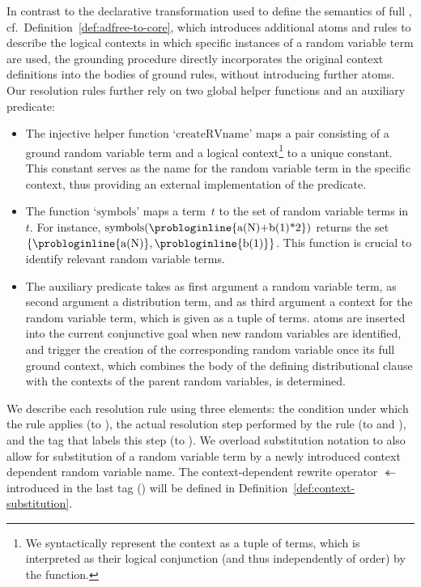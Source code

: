In contrast to the declarative transformation used to define the semantics of full \dcproblogsty, cf.~Definition~\ref{def:adfree-to-core}, which introduces additional atoms and rules to describe the logical contexts in which specific instances of a random variable term are used, the grounding procedure directly incorporates the original context definitions into the bodies of ground rules, without introducing further atoms.  
Our resolution rules further rely on two global helper functions and an auxiliary predicate:
\begin{itemize}
	\item The injective helper function `$\mathrm{createRVname}$' maps a pair consisting of a ground random variable term and a logical context\footnote{We syntactically represent the context as a tuple of terms, which is interpreted as their logical conjunction (and thus independently of order) by the function.} to a unique constant. This constant serves as the name for the random variable term in the specific context, thus providing an external implementation of the  predicate.
	\item The function `$\mathrm{symbols}$' maps a term~$t$  to the set of random variable terms in~$t$.  For instance, $\mathrm{symbols}(\text{\probloginline{a(N)+b(1)*2}})$ returns the set $\{ \text{\probloginline{a(N)}}, \text{\probloginline{b(1)}} \}$. This function is crucial to identify relevant random variable terms. 
	\item The auxiliary predicate   takes as first argument a random variable term, as second argument a distribution term, and as third argument a context for the random variable term, which is given as a tuple of terms.  atoms are inserted into the current conjunctive goal when new random variables are identified, and trigger the creation of the corresponding random variable once its full ground context, which combines the body of the defining distributional clause with the contexts of the parent random variables, is determined.
\end{itemize}

We describe each resolution rule using three elements: the condition under which the rule applies (\cposlit to \crvone), the actual resolution step performed by the rule (\rposlit to \rrvonea and \rrvoneb), and the tag that labels this step (\tposlit to \trvone). We overload substitution notation to also allow for substitution of a random variable term by a newly introduced context dependent random variable name. The context-dependent rewrite operator $\twoheadleftarrow$ introduced in the last tag (\trvone) will be defined in Definition~\ref{def:context-substitution}.

